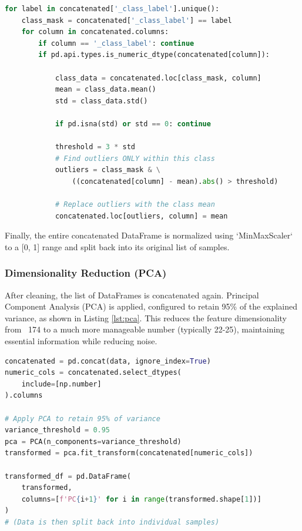 \documentclass[]{IEEEphot}
\begin{document}
\begin{lstlisting}[language=Python, caption={Per-class outlier removal logic from `data_preprocess` in `utils/data_processing.py`.}, label={lst:outlier}, captionpos=t]
for label in concatenated['_class_label'].unique():
    class_mask = concatenated['_class_label'] == label
    for column in concatenated.columns:
        if column == '_class_label': continue
        if pd.api.types.is_numeric_dtype(concatenated[column]):
            
            class_data = concatenated.loc[class_mask, column]
            mean = class_data.mean()
            std = class_data.std()
            
            if pd.isna(std) or std == 0: continue
            
            threshold = 3 * std
            # Find outliers ONLY within this class
            outliers = class_mask & \
                ((concatenated[column] - mean).abs() > threshold)
            
            # Replace outliers with the class mean
            concatenated.loc[outliers, column] = mean
\end{lstlisting}

Finally, the entire concatenated DataFrame is normalized using `MinMaxScaler` to a [0, 1] range and split back into its original list of samples.

\subsubsection{Dimensionality Reduction (PCA)}
After cleaning, the list of DataFrames is concatenated again. Principal Component Analysis (PCA) is applied, configured to retain 95\% of the explained variance, as shown in Listing \ref{lst:pca}. This reduces the feature dimensionality from ~174 to a much more manageable number (typically 22-25), maintaining essential information while reducing noise.

\begin{lstlisting}[language=Python, caption={PCA application from \texttt{apply\_pca} in \texttt{utils/data\_processing.py}.}, label={lst:pca}, captionpos=t]
concatenated = pd.concat(data, ignore_index=True)
numeric_cols = concatenated.select_dtypes(
    include=[np.number]
).columns

# Apply PCA to retain 95% of variance
variance_threshold = 0.95
pca = PCA(n_components=variance_threshold) 
transformed = pca.fit_transform(concatenated[numeric_cols])

transformed_df = pd.DataFrame(
    transformed, 
    columns=[f'PC{i+1}' for i in range(transformed.shape[1])]
)
# (Data is then split back into individual samples)
\end{lstlisting}
\end{document}
